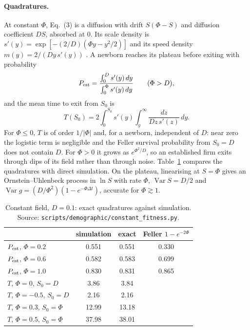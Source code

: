 \documentclass[pre,onecolumn,superscriptaddress,nofootinbib]{revtex4-2}
\newcommand{\Var}{\operatorname{Var}}
\begin{document}
\paragraph{Quadratures.}  At constant $\Phi$, Eq.~(3) is a diffusion with drift $S(\Phi-S)$ and diffusion
coefficient $DS$, absorbed at $0$.  Its scale density is $s'(y)=\exp[-(2/D)(\Phi y-y^2/2)]$ and its speed
density $m(y)=2/(Dy\,s'(y))$ \cite{karlintaylor1981}.  A newborn reaches its plateau before exiting with
probability
\begin{equation}
P_{\rm est}=\frac{\int_0^Ds'(y)\,dy}{\int_0^\Phi s'(y)\,dy}\qquad(\Phi>D),
\end{equation}
and the mean time to exit from $S_0$ is
\begin{equation}
T(S_0)=2\int_0^{S_0}s'(y)\int_y^\infty\frac{dz}{Dz\,s'(z)}\,dy .
\end{equation}
For $\Phi\le0$, $T$ is of order $1/|\Phi|$ and, for a newborn, independent of $D$: near zero the logistic
term is negligible and the Feller survival probability from $S_0=D$ does not contain $D$.  For
$\Phi>0$ it grows as $e^{\Phi^2/D}$, so an established firm exits through dips of its field rather than
through noise.  Table~\ref{tab:constant} compares the quadratures with direct simulation.  On the
plateau, linearising at $S=\Phi$ gives an Ornstein--Uhlenbeck process in $\ln S$ with rate $\Phi$, $\Var
S=D/2$ and $\Var g=(D/\Phi^2)(1-e^{-\Phi\Delta t})$, accurate for $\Phi\gtrsim1$.

\begin{table}[h]
\caption{Constant field, $D=0.1$: exact quadratures against simulation.  Source:
\texttt{scripts/demographic/constant\_fitness.py}.}
\label{tab:constant}
\begin{ruledtabular}
\begin{tabular}{lccc}
 & simulation & exact & Feller $1-e^{-2\Phi}$\\
\hline
$P_{\rm est}$, $\Phi=0.2$ & 0.551 & 0.551 & 0.330\\
$P_{\rm est}$, $\Phi=0.6$ & 0.582 & 0.583 & 0.699\\
$P_{\rm est}$, $\Phi=1.0$ & 0.830 & 0.831 & 0.865\\
$T$, $\Phi=0$, $S_0=D$ & 3.86 & 3.84 & \\
$T$, $\Phi=-0.5$, $S_0=D$ & 2.16 & 2.16 & \\
$T$, $\Phi=0.3$, $S_0=\Phi$ & 12.99 & 13.18 & \\
$T$, $\Phi=0.5$, $S_0=\Phi$ & 37.98 & 38.01 & \\
\end{tabular}
\end{ruledtabular}
\end{table}
\end{document}

